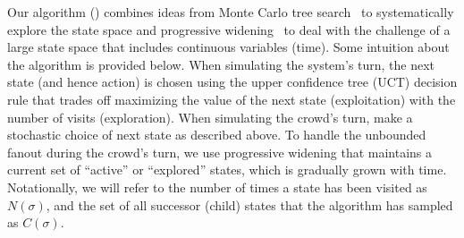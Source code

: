 %
%
%

Our algorithm () combines ideas from Monte Carlo tree search~\citep{kocsis2006bandit} to systematically explore the state space and 
progressive widening~\citep{coulom2007computing} to deal with the challenge of a large state space that includes continuous variables (time).
Some intuition about the algorithm is provided below.
When simulating the system's turn, the next state (and hence action) is chosen using the upper confidence tree (UCT) decision rule that trades off maximizing the value of the next state (exploitation) with the number of visits (exploration).
When simulating the crowd's turn, make a stochastic choice of next state as described above. 
To handle the unbounded fanout during the crowd's turn, we use progressive widening  
that maintains a current set of ``active'' or ``explored'' states, which is gradually grown with time. 
Notationally, we will refer to the number of times a state has been visited as $N(\sigma)$, and the set of all successor (child) states that the algorithm has sampled as $C(\sigma)$.

